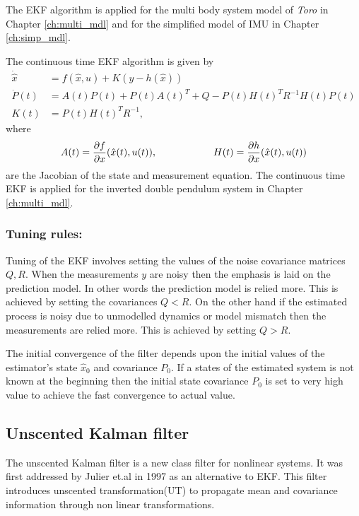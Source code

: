 The EKF algorithm is applied for the multi body system model of \emph{Toro} in Chapter \ref{ch:multi_mdl} and for the simplified model of IMU in Chapter \ref{ch:simp_mdl}.

The continuous time EKF algorithm is given by \citep{gel74}
\begin{equation}
    \label{eq:ekf_con}
    \begin{split}
        \dot {\hat x} &= f(\hat x,u) + K ( y-h(\hat x))\\
        \dot P(t) &= A(t)P(t) + P(t)A(t)^T + Q - P(t)H(t)^TR^{-1}H(t)P(t)\\
        K(t) &= P(t)H(t)^TR^{-1},
    \end{split}
\end{equation}
where $$A(t) = \frac{\partial {f}}{\partial {x}}(\hat x(t), u(t)), \hspace{2cm} H(t) = \frac{\partial {h}}{\partial {x}} (\hat x(t), u(t))$$ are the Jacobian of the state and measurement equation. The continuous time EKF is applied for the inverted double pendulum system in Chapter \ref{ch:multi_mdl}.

\subsubsection{Tuning rules:}
\label{subsec:tune_ekf}
Tuning of the EKF involves setting the values of the noise covariance matrices $Q,R$. When the measurements $y$ are noisy then the emphasis is laid on the prediction model. In other words the prediction model is relied more. This is achieved by setting the covariances $Q<R$. On the other hand if the estimated process is noisy due to unmodelled dynamics or model mismatch then the measurements are relied more. This is achieved by setting $Q>R$.

The initial convergence of the filter depends upon the initial values of the estimator's state $\hat x_0$ and covariance $P_0$. If a states of the estimated system is not known at the beginning then the initial state covariance $P_0$ is set to very high value to achieve the fast convergence to actual value.

\subsection{Unscented Kalman filter}
The unscented Kalman filter is a new class filter for nonlinear systems. It was first addressed by Julier et.al in 1997 \citep{jul97} as an alternative to EKF. This filter introduces unscented transformation(UT) to propagate mean and covariance information through non linear transformations.

